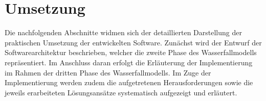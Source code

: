 \section{Umsetzung} \label{sec:umsetzung}

Die nachfolgenden Abschnitte widmen sich der detaillierten Darstellung der praktischen Umsetzung der entwickelten Software. Zunächst wird der Entwurf der Softwarearchitektur beschrieben, welcher die zweite Phase des Wasserfallmodells repräsentiert. Im Anschluss daran erfolgt die Erläuterung der Implementierung im Rahmen der dritten Phase des Wasserfallmodells. Im Zuge der Implementierung werden zudem die aufgetretenen Herausforderungen sowie die jeweils erarbeiteten Lösungsansätze systematisch aufgezeigt und erläutert.
